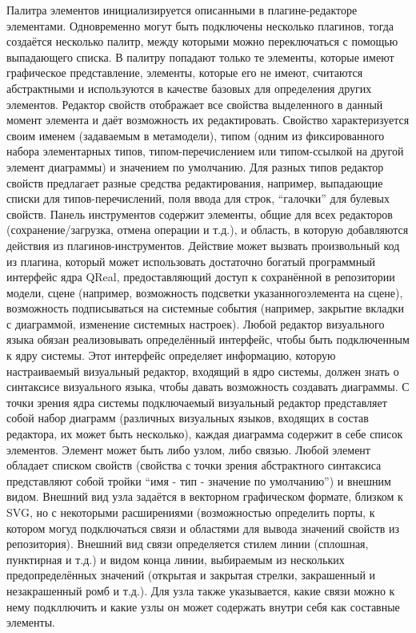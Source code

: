 	Палитра элементов инициализируется описанными в плагине-редакторе элементами. Одновременно могут быть подключены несколько плагинов, тогда создаётся  несколько палитр, между которыми можно переключаться с помощью выпадающего списка. В палитру попадают только те элементы, которые имеют графическое представление, элементы, которые его не имеют, считаются абстрактными и используются в качестве базовых для определения других элементов.
	Редактор свойств отображает все свойства выделенного в данный момент элемента и даёт возможность их редактировать. Свойство характеризуется своим именем (задаваемым в метамодели), типом (одним из фиксированного набора элементарных типов, типом-перечислением или типом-ссылкой на другой элемент диаграммы) и значением по умолчанию. Для разных типов редактор свойств предлагает разные средства редактирования, например, выпадающие списки для типов-перечислений, поля ввода для строк, “галочки” для булевых свойств.
	Панель инструментов содержит элементы, общие для всех редакторов (сохранение/загрузка, отмена операции и т.д.), и область, в которую добавляются действия из плагинов-инструментов. Действие может вызвать произвольный код из плагина, который может использовать достаточно богатый программный интерфейс ядра QReal, предоставляющий доступ к сохранённой в репозитории модели, сцене (например, возможность подсветки указанногоэлемента на сцене), возможность подписываться на системные события (например, закрытие вкладки с диаграммой, изменение системных настроек).
	Любой редактор визуального языка обязан реализовывать определённый интерфейс, чтобы быть подключенным к ядру системы. Этот интерфейс определяет информацию, которую настраиваемый визуальный редактор, входящий в ядро системы, должен знать о синтаксисе визуального языка, чтобы давать возможность создавать диаграммы. С точки зрения ядра системы подключаемый визуальный редактор представляет собой набор диаграмм (различных визуальных языков, входящих в состав редактора, их может быть несколько), каждая диаграмма содержит в себе список элементов. Элемент может быть либо узлом, либо связью. Любой элемент обладает списком свойств (свойства с точки зрения абстрактного синтаксиса представляют собой тройки “имя - тип - значение по умолчанию”) и внешним видом. Внешний вид узла задаётся в векторном графическом формате, близком к SVG, но с некоторыми расширениями (возможностью определить порты, к котором могуд подключаться связи и областями для вывода значений свойств из репозитория). Внешний вид связи определяется стилем линии (сплошная, пунктирная и т.д.) и видом конца линии, выбираемым из нескольких предопределённых значений (открытая и закрытая стрелки, закрашенный и незакрашенный ромб и т.д.). Для узла также указывается, какие связи можно к нему подкллючить и какие узлы он может содержать внутри себя как составные элементы.
